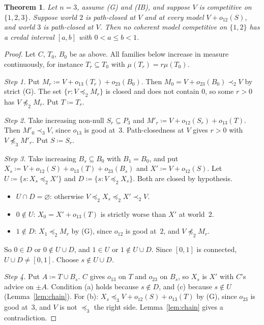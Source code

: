\documentclass[11pt]{article}
\newtheorem{theorem}{Theorem}
\theoremstyle{definition}\newtheorem{definition}[theorem]{Definition}
\theoremstyle{remark}\newtheorem{remark}[theorem]{Remark}
\begin{document}
\begin{theorem}\label{thm:pathclosed}
Let $n=3$, assume (G) and (IB), and suppose $V$ is competitive on
$\{1,2,3\}$. Suppose world $2$ is path-closed at $V$ and at every model
$V+o_{12}(S)$, and world $3$ is path-closed at $V$. Then no coherent model
competitive on $\{1,2\}$ has a credal interval $[a,b]$ with $0<a\le b<1$.
\end{theorem}
\begin{proof}
Let $C$, $T_0$, $B_0$ be as above. All families below increase in measure
continuously, for instance $T_r\subseteq T_0$ with $\mu(T_r)=r\mu(T_0)$.

\emph{Step 1.} Put $M_r\coloneqq V+o_{13}(T_r)+o_{23}(B_0)$. Then
$M_0=V+o_{23}(B_0)\prec_2V$ by strict (G). The set $\{r:V\preceq_2M_r\}$ is
closed and does not contain $0$, so some $r>0$ has $V\not\preceq_2M_r$. Put
$T\coloneqq T_r$.

\emph{Step 2.} Take increasing non-null $S_r\subseteq P_3$ and
$M'_r\coloneqq V+o_{12}(S_r)+o_{13}(T)$. Then $M'_0\prec_3V$, since $o_{13}$
is good at~$3$. Path-closedness at $V$ gives $r>0$ with $V\not\preceq_3M'_r$.
Put $S\coloneqq S_r$.

\emph{Step 3.} Take increasing $B_s\subseteq B_0$ with $B_1=B_0$, and put
$X_s\coloneqq V+o_{12}(S)+o_{13}(T)+o_{23}(B_s)$ and $X'\coloneqq V+o_{12}(S)$.
Let $U\coloneqq\{s:X_s\preceq_2X'\}$ and $D\coloneqq\{s:V\preceq_2X_s\}$.
Both are closed by hypothesis.
\begin{itemize}[leftmargin=*,itemsep=1pt]
\item $U\cap D=\varnothing$: otherwise $V\preceq_2X_s\preceq_2X'\prec_2V$.
\item $0\notin U$: $X_0=X'+o_{13}(T)$ is strictly worse than $X'$ at world~$2$.
\item $1\notin D$: $X_1\preceq_2M_r$ by (G), since $o_{12}$ is good at~$2$, and
$V\not\preceq_2M_r$.
\end{itemize}
So $0\in D$ or $0\notin U\cup D$, and $1\in U$ or $1\notin U\cup D$. Since
$[0,1]$ is connected, $U\cup D\ne[0,1]$. Choose $s\notin U\cup D$.

\emph{Step 4.} Put $A\coloneqq T\cup B_s$. $C$ gives $o_{13}$ on $T$ and
$o_{23}$ on $B_s$, so $X_s$ is $X'$ with $C$'s advice on $\pm A$. Condition
(a) holds because $s\notin D$, and (c) because $s\notin U$
(Lemma~\ref{lem:chain}). For (b): $X_s\preceq_3V+o_{12}(S)+o_{13}(T)$ by (G),
since $o_{23}$ is good at~$3$, and $V$ is not $\preceq_3$ the right side.
Lemma~\ref{lem:chain} gives a contradiction.
\end{proof}
\end{document}
